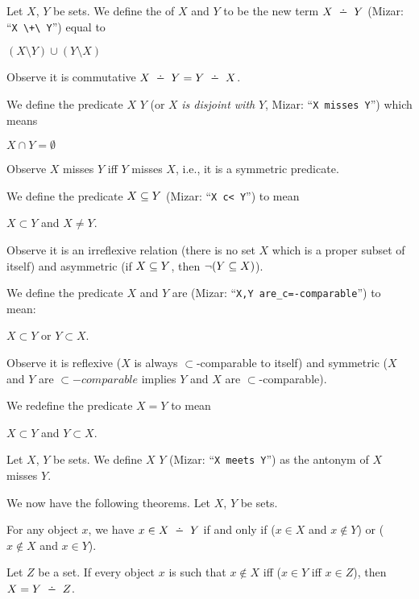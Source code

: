 \begin{definition}
Let $X$, $Y$ be sets. We define the  of $X$
and $Y$ to be the new term $X\symdiff Y$ (Mizar: ``\verb#X \+\ Y#'') equal to
\begin{defn}
\item $(X\setminus Y)\cup(Y\setminus X)$
\end{defn}
Observe it is commutative $X\symdiff Y=Y\symdiff X$.

We define the predicate $X$  $Y$ (or $X$ \emph{is disjoint with} $Y$, Mizar: ``\verb#X misses Y#'')
which means
\begin{defn}
\item $X\cap Y=\emptyset$
\end{defn}
Observe $X$ misses $Y$ iff $Y$ misses $X$, i.e., it is a symmetric predicate.

We define the predicate $X\properSubset Y$ (Mizar: ``\verb#X c< Y#'')
to mean
\begin{defn}
\item $X\subset Y$ and $X\neq Y$.
\end{defn}
Observe it is an irreflexive relation (there is no set $X$ which is a
proper subset of itself) and asymmetric (if $X\properSubset Y$, then
$\neg(Y\properSubset X)$).

We define the predicate $X$ and $Y$ are 
(Mizar: ``\verb#X,Y are_c=-comparable#'') to mean:
\begin{defn}
\item $X\subset Y$ or $Y\subset X$.
\end{defn}
Observe it is reflexive ($X$ is always $\subset$-comparable to itself)
and symmetric ($X$ and $Y$ are $\subset-comparable$ implies $Y$ and $X$
are $\subset$-comparable).

We redefine the predicate $X=Y$ to mean
\begin{defn}
\item $X\subset Y$ and $Y\subset X$.
\end{defn}
\end{definition}

\begin{definition}
Let $X$, $Y$ be sets. We define $X$  $Y$ (Mizar:
``\verb#X meets Y#'') as the antonym of $X$ misses $Y$.
\end{definition}

We now have the following theorems. Let $X$, $Y$ be sets.

\begin{thm}
\item For any object $x$, we have $x\in X\symdiff Y$ if and only if
  ($x\in X$ and $x\notin Y$) or ($x\notin X$ and $x\in Y$).
\item Let $Z$ be a set. If every object $x$ is such that $x\notin X$ iff
  ($x\in Y$ iff $x\in Z$), then $X=Y\symdiff Z$.
\end{thm}

